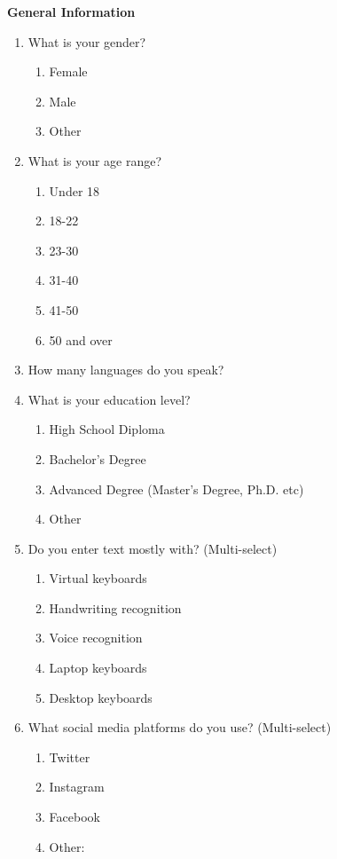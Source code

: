 \documentclass[acmsmall,screen,authorversion,nonacm]{acmart}
\begin{document}
\textbf{General Information}
\begin{enumerate}
    \item What is your gender?
        \begin{enumerate}
            \item Female
            \item Male
            \item Other
        \end{enumerate}
    \item What is your age range?
        \begin{enumerate}
            \item Under 18
            \item 18-22
            \item 23-30
            \item 31-40
            \item 41-50
            \item 50 and over
        \end{enumerate}
    \item How many languages do you speak?
    \item What is your education level?
        \begin{enumerate}
            \item High School Diploma
            \item Bachelor's Degree
            \item Advanced Degree (Master's Degree, Ph.D. etc)
            \item Other
        \end{enumerate}
    \item Do you enter text mostly with?  (Multi-select)
        \begin{enumerate}
            \item Virtual keyboards
            \item Handwriting recognition
            \item Voice recognition
            \item Laptop keyboards
            \item Desktop keyboards
        \end{enumerate}
        \item What social media platforms do you use? (Multi-select)
            \begin{enumerate}
                \item Twitter
                \item Instagram
                \item Facebook
                \item Other:
            \end{enumerate}
\end{enumerate}
\end{document}
